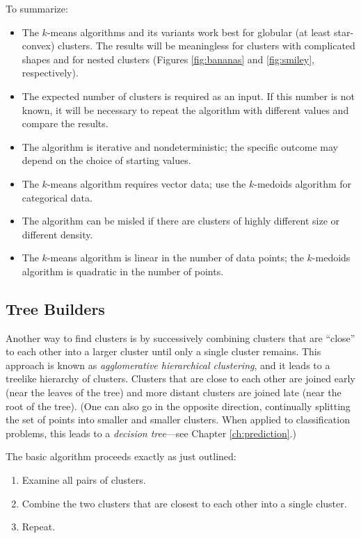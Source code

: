 To summarize: 

\begin{itemize}
\item The $k$-means algorithms and its variants work best for globular
  (at least star-convex) clusters. The results will be meaningless for
  clusters with complicated shapes and for nested clusters (Figures
  \ref{fig:bananas} and \ref{fig:smiley}, respectively).
\item The expected number of clusters is required as an input. If this
  number is not known, it will be necessary to repeat the algorithm 
  with different values and compare the results.
\item The algorithm is iterative and nondeterministic; the specific
  outcome may depend on the choice of starting values.
\item The $k$-means algorithm requires vector data; use the
  $k$-medoids algorithm for categorical data.
\item The algorithm can be misled if there are clusters of highly
  different size or different density.
\item The $k$-means algorithm is linear in the number of data points;
  the $k$-medoids algorithm is quadratic in the number of points.\vspace*{-3pt}
\end{itemize}

\subsection{Tree Builders}


Another way to find clusters is by successively combining clusters
that are ``close'' to each other into a larger cluster until only a
single cluster remains. This approach is known as \emph{agglomerative
  hierarchical clustering},  and it leads to a treelike hierarchy of
clusters. Clusters that are close to each other are joined early (near
the leaves of the tree) and more distant clusters are joined late (near
the root of the tree). (One can also go in the opposite direction,
continually splitting the set of points into smaller and smaller
clusters. When applied to classification problems, this leads to a
\emph{decision tree}---see Chapter \ref{ch:prediction}.)

The basic algorithm proceeds exactly as just outlined:

\begin{enumerate}
\item Examine all pairs of clusters.
\item Combine the two clusters that are closest to each other into a
  single cluster.
\item Repeat.
\end{enumerate}

